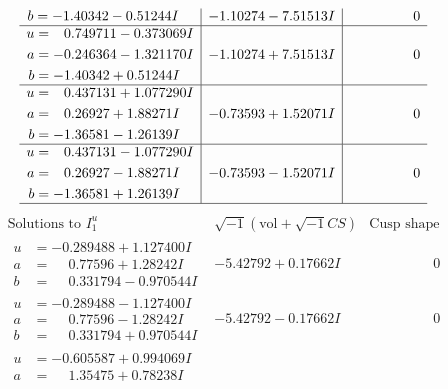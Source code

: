 \documentclass[1p]{elsarticle_modified}
\theoremstyle{definition}
\newcommand{\I}{\sqrt{-1}}
\begin{document}
$$\begin{array}{c|c|c}
\begin{aligned}
b &= -1.40342 - 0.51244 I\end{aligned}
 & -1.10274 - 7.51513 I & \phantom{-0.000000 } 0 \\ \hline\begin{aligned}
u &= \phantom{-}0.749711 - 0.373069 I \\
a &= -0.246364 - 1.321170 I \\
b &= -1.40342 + 0.51244 I\end{aligned}
 & -1.10274 + 7.51513 I & \phantom{-0.000000 } 0 \\ \hline\begin{aligned}
u &= \phantom{-}0.437131 + 1.077290 I \\
a &= \phantom{-}0.26927 + 1.88271 I \\
b &= -1.36581 - 1.26139 I\end{aligned}
 & -0.73593 + 1.52071 I & \phantom{-0.000000 } 0 \\ \hline\begin{aligned}
u &= \phantom{-}0.437131 - 1.077290 I \\
a &= \phantom{-}0.26927 - 1.88271 I \\
b &= -1.36581 + 1.26139 I\end{aligned}
 & -0.73593 - 1.52071 I & \phantom{-0.000000 } 0\\
 \hline 
 \end{array}$$\newpage$$\begin{array}{c|c|c}  
\text{Solutions to }I^u_{1}& \I (\text{vol} + \sqrt{-1}CS) & \text{Cusp shape}\\
 \hline 
\begin{aligned}
u &= -0.289488 + 1.127400 I \\
a &= \phantom{-}0.77596 + 1.28242 I \\
b &= \phantom{-}0.331794 - 0.970544 I\end{aligned}
 & -5.42792 + 0.17662 I & \phantom{-0.000000 } 0 \\ \hline\begin{aligned}
u &= -0.289488 - 1.127400 I \\
a &= \phantom{-}0.77596 - 1.28242 I \\
b &= \phantom{-}0.331794 + 0.970544 I\end{aligned}
 & -5.42792 - 0.17662 I & \phantom{-0.000000 } 0 \\ \hline\begin{aligned}
u &= -0.605587 + 0.994069 I \\
a &= \phantom{-}1.35475 + 0.78238 I \\

\end{aligned}
\end{array}$$
\end{document}
